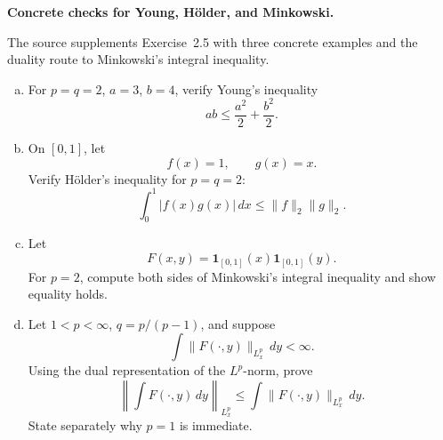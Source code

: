 \begin{problem}[CP-III-0008]
\label{prob:cp-iii-0008}
\textbf{Concrete checks for Young, Hölder, and Minkowski.}

The source supplements Exercise~2.5 with three concrete examples and the
duality route to Minkowski's integral inequality.

\begin{enumerate}[(a)]
\item For \(p=q=2\), \(a=3\), \(b=4\), verify Young's inequality
\[
ab
\le
\frac{a^2}{2}
+
\frac{b^2}{2}.
\]

\item On \([0,1]\), let
\[
f(x)=1,
\qquad
g(x)=x.
\]
Verify Hölder's inequality for \(p=q=2\):
\[
\int_0^1|f(x)g(x)|\,dx
\le
\|f\|_2\|g\|_2.
\]

\item Let
\[
F(x,y)
=
\mathbf1_{[0,1]}(x)\mathbf1_{[0,1]}(y).
\]
For \(p=2\), compute both sides of Minkowski's integral inequality and
show equality holds.

\item Let \(1<p<\infty\), \(q=p/(p-1)\), and suppose
\[
\int
\|F(\cdot,y)\|_{L_x^p}\,dy
<\infty.
\]
Using the dual representation of the \(L^p\)-norm, prove
\[
\left\|
\int F(\cdot,y)\,dy
\right\|_{L_x^p}
\le
\int
\|F(\cdot,y)\|_{L_x^p}\,dy.
\]
State separately why \(p=1\) is immediate.
\end{enumerate}
\end{problem}

